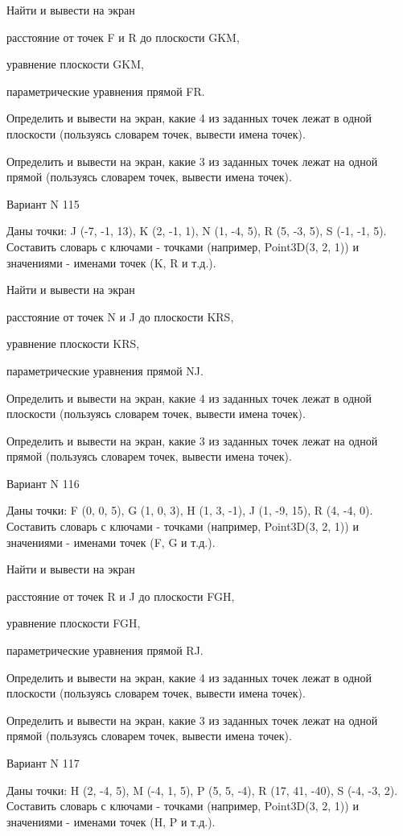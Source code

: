 \documentclass[11pt]{report}
\begin{document}
 
Найти и вывести на экран


расстояние от точек F и R до плоскости GKM,

 
уравнение плоскости GKM,

 
параметрические уравнения прямой FR.


Определить и вывести на экран, какие 4 из заданных точек лежат в одной плоскости (пользуясь словарем точек, вывести имена точек).


Определить и вывести на экран, какие 3 из заданных точек лежат на одной прямой (пользуясь словарем точек, вывести имена точек).

Вариант N 115

Даны точки: J (-7, -1, 13), K (2, -1, 1), N (1, -4, 5), R (5, -3, 5), S (-1, -1, 5).
Составить словарь с ключами - точками (например, Point3D(3, 2, 1)) и значениями - именами точек (K, R и т.д.).

 
Найти и вывести на экран


расстояние от точек N и J до плоскости KRS,

 
уравнение плоскости KRS,

 
параметрические уравнения прямой NJ.


Определить и вывести на экран, какие 4 из заданных точек лежат в одной плоскости (пользуясь словарем точек, вывести имена точек).


Определить и вывести на экран, какие 3 из заданных точек лежат на одной прямой (пользуясь словарем точек, вывести имена точек).

Вариант N 116

Даны точки: F (0, 0, 5), G (1, 0, 3), H (1, 3, -1), J (1, -9, 15), R (4, -4, 0).
Составить словарь с ключами - точками (например, Point3D(3, 2, 1)) и значениями - именами точек (F, G и т.д.).

 
Найти и вывести на экран


расстояние от точек R и J до плоскости FGH,

 
уравнение плоскости FGH,

 
параметрические уравнения прямой RJ.


Определить и вывести на экран, какие 4 из заданных точек лежат в одной плоскости (пользуясь словарем точек, вывести имена точек).


Определить и вывести на экран, какие 3 из заданных точек лежат на одной прямой (пользуясь словарем точек, вывести имена точек).

Вариант N 117

Даны точки: H (2, -4, 5), M (-4, 1, 5), P (5, 5, -4), R (17, 41, -40), S (-4, -3, 2).
Составить словарь с ключами - точками (например, Point3D(3, 2, 1)) и значениями - именами точек (H, P и т.д.).
\end{document}

